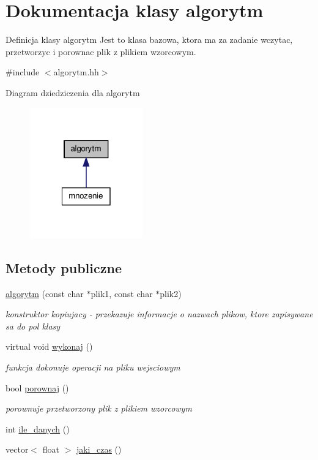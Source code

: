 \hypertarget{classalgorytm}{\section{\-Dokumentacja klasy algorytm}
\label{classalgorytm}
}


\-Definicja klasy algorytm \-Jest to klasa bazowa, ktora ma za zadanie wczytac, przetworzyc i porownac plik z plikiem wzorcowym.  




{\ttfamily \#include $<$algorytm.\-hh$>$}



\-Diagram dziedziczenia dla algorytm
\nopagebreak
\begin{figure}[H]
\begin{center}
\leavevmode
\includegraphics[width=138pt]{classalgorytm__inherit__graph}
\end{center}
\end{figure}
\subsection*{\-Metody publiczne}
\begin{DoxyCompactItemize}
\item 
\hyperlink{classalgorytm_a138ed27849535b192fec3d2e9f6a644f}{algorytm} (const char $\ast$plik1, const char $\ast$plik2)
\begin{DoxyCompactList}\small\item\em konstruktor kopiujacy -\/ przekazuje informacje o nazwach plikow, ktore zapisywane sa do pol klasy \end{DoxyCompactList}\item 
virtual void \hyperlink{classalgorytm_a85ba543fad39e8987bbda4ee698b5fec}{wykonaj} ()
\begin{DoxyCompactList}\small\item\em funkcja dokonuje operacji na pliku wejsciowym \end{DoxyCompactList}\item 
bool \hyperlink{classalgorytm_a167adca6239e12cb5d362fd7c905dde0}{porownaj} ()
\begin{DoxyCompactList}\small\item\em porownuje przetworzony plik z plikiem wzorcowym \end{DoxyCompactList}\item 
int \hyperlink{classalgorytm_acbd9260a0b2055acee485f737b960992}{ile\-\_\-danych} ()
\item 
vector$<$ float $>$ \hyperlink{classalgorytm_a244d9cbf20639faf0b60ae6cdae3c657}{jaki\-\_\-czas} ()
\end{DoxyCompactItemize}
